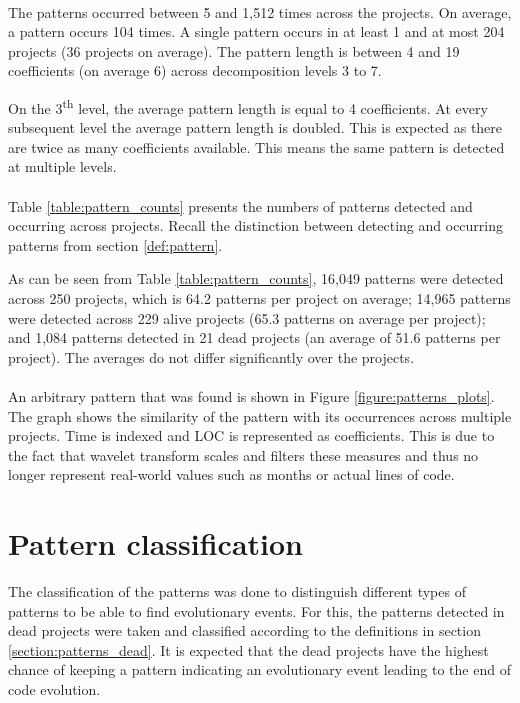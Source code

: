 \paragraph{}
The patterns occurred between 5 and 1,512 times across the projects. On
average, a pattern occurs 104 times. A single pattern occurs in at least 1 and
at most 204 projects (36 projects on average). The pattern length is between 4
and 19 coefficients (on average 6) across decomposition levels 3 to 7.

On the 3\textsuperscript{th} level, the average pattern length is equal to 4
coefficients. At every subsequent level the average pattern length is doubled.
This is expected as there are twice as many coefficients available. This means
the same pattern is detected at multiple levels.

\paragraph{}
Table \ref{table:pattern_counts} presents the numbers of patterns
detected and occurring across projects. Recall the distinction between
detecting and occurring patterns from section \ref{def:pattern}.



\noindent
As can be seen from Table \ref{table:pattern_counts}, 16,049 patterns were
detected across 250 projects, which is 64.2 patterns per project on average;
14,965 patterns were detected across 229 alive projects (65.3 patterns on
average per project); and 1,084 patterns detected in 21 dead projects (an
average of 51.6 patterns per project). The averages do not differ significantly
over the projects.

\paragraph{}
An arbitrary pattern that was found is shown in Figure
\ref{figure:patterns_plots}. The graph shows the similarity of the pattern with
its occurrences across multiple projects. Time is indexed and LOC is
represented as coefficients. This is due to the fact that wavelet transform
scales and filters these measures and thus no longer represent real-world
values such as months or actual lines of code.





\section{Pattern classification}
The classification of the patterns was done to distinguish different types of
patterns to be able to find evolutionary events. For this, the patterns
detected in dead projects were taken and classified according to
the definitions in section \ref{section:patterns_dead}. It is expected that
the dead projects have the highest chance of keeping a pattern indicating
an evolutionary event leading to the end of code evolution.

